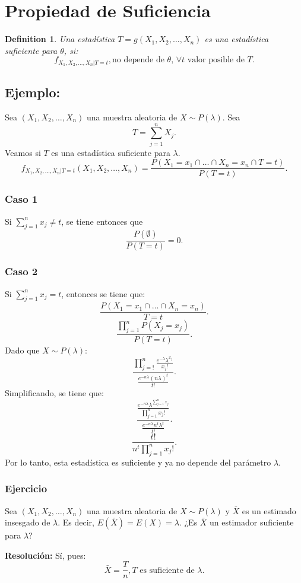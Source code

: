 \documentclass{article}
\newtheorem{mydef}{Definition}
\begin{document}
\section{Propiedad de Suficiencia}
\begin{mydef}
Una estadística $T=g(X_{1},X_{2},\ldots,X_{n})$ es una estadística suficiente para $\theta$, si:
\[ f_{X_{1},X_{2},\ldots,X_{n}|T=t}, \text{no depende de $\theta$, $\forall t$ valor posible de $T$}.\]
\end{mydef}

\subsection{Ejemplo:}
Sea $(X_{1},X_{2},\ldots,X_{n})$ una muestra aleatoria de $X\sim P(\lambda)$. Sea
\[ T=\sum_{j=1}^{n}X_{j}.\]
Veamos si $T$ es una estadística suficiente para $\lambda$.
\[ f_{X_{1},X_{2},\ldots,X_{n}|T=t}(X_{1},X_{2},\ldots,X_{n})=\frac{P(X_{1}=x_{1}\cap \ldots \cap X_{n}=x_{n} \cap T=t)}{P(T=t)}.\]
\subsubsection{Caso 1}
Si $\sum_{j=1}^{n}x_{j} \neq t$, se tiene entonces que
\[ \frac{P(\emptyset)}{P(T=t)}=0.\]
\subsubsection{Caso 2}
Si $\sum_{j=1}^{n}x_{j}=t$, entonces se tiene que:
\[ \frac{P(X_{1}=x_{1}\cap \ldots \cap X_{n}=x_{n})}{T=t}.\]
\[ \frac{\prod_{j=1}^{n}P(X_{j}=x_{j})}{P(T=t)}.\]
Dado que $X\sim P(\lambda)$:
\[ \frac{\prod_{j=!}^{n}\frac{e^{-\lambda}\lambda^{x_{j}}}{x_{j}!}}{\frac{e^{-n\lambda}(n\lambda)^{t}}{t!}}.\]
Simplificando, se tiene que:
\[ \frac{\frac{e^{-n\lambda}\lambda^{\sum_{j=1}^{n}x_{j}}}{\prod_{j=1}^{n}x_{j}!}}{\frac{e^{-n\lambda}n^{t}\lambda^{t}}{t!}}.\]
\[ \frac{t!}{n^{t}\prod_{j=1}^{n}x_{j}!}.\]
Por lo tanto, esta estadística es suficiente y ya no depende del parámetro $\lambda$.

\subsubsection{Ejercicio}
Sea $(X_{1},X_{2},\ldots,X_{n})$ una muestra aleatoria de $X\sim P(\lambda)$ y $\bar{X}$ es un estimado insesgado de $\lambda$. Es decir, $E(\bar{X})=E(X)=\lambda$. ¿Es $\bar{X}$ un estimador suficiente para $\lambda$?

\textbf{Resolución: } Sí, pues:
\[ \bar{X}=\frac{T}{n}, \text{$T$ es suficiente de $\lambda$}.\]
\end{document}
